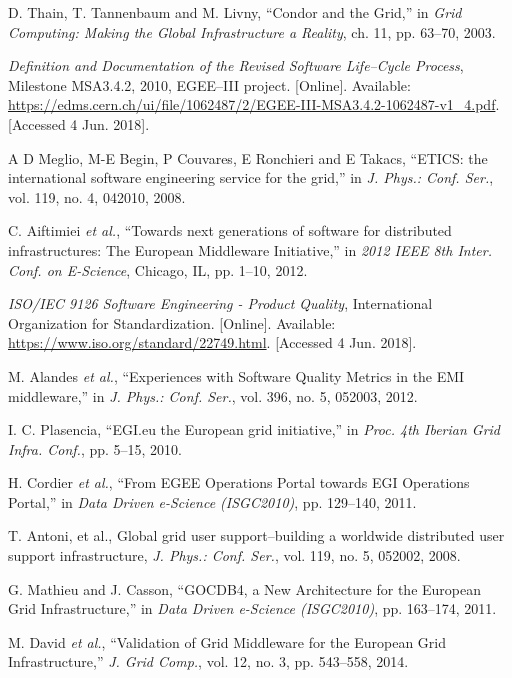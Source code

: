 \documentclass[journal]{IEEEtran}
\begin{document}
\begin{thebibliography}{1}
D. Thain, T. Tannenbaum and M. Livny,
``Condor and the Grid,''
in \emph{Grid Computing: Making the Global Infrastructure a Reality},
ch. 11, pp. 63--70, 2003.


\emph{Definition and Documentation of the Revised Software Life--Cycle Process},
Milestone MSA3.4.2, 2010, EGEE--III project.
[Online]. Available: \url{https://edms.cern.ch/ui/file/1062487/2/EGEE-III-MSA3.4.2-1062487-v1_4.pdf}.
[Accessed 4 Jun. 2018].

A D Meglio, M-E Begin, P Couvares, E Ronchieri and E Takacs,
``ETICS: the international software engineering service for the grid,''
in \emph{J. Phys.: Conf. Ser.},
vol. 119, no. 4, 042010, 2008.



C. Aiftimiei \emph{et al.},
``Towards next generations of software for distributed infrastructures: The European Middleware Initiative,''
in \emph{2012 IEEE 8th Inter. Conf. on E-Science},
Chicago, IL, pp. 1--10, 2012.

\emph{ISO/IEC 9126 Software Engineering - Product Quality},
International Organization for Standardization.
[Online]. Available: \url{https://www.iso.org/standard/22749.html}.
[Accessed 4 Jun. 2018].

M. Alandes \emph{et al.},
``Experiences with Software Quality Metrics in the EMI middleware,''
in \emph{J. Phys.: Conf. Ser.},
vol. 396, no. 5, 052003, 2012.

I. C. Plasencia,
``EGI.eu the European grid initiative,''
in \emph{Proc. 4th Iberian Grid Infra. Conf.},
pp. 5--15, 2010.

H. Cordier \emph{et al.},
``From EGEE Operations Portal towards EGI Operations Portal,''
in \emph{Data Driven e-Science (ISGC2010)},
pp. 129--140, 2011.

T. Antoni, et al.,
Global grid user support--building a worldwide distributed user support infrastructure,
\emph{J. Phys.: Conf. Ser.},
vol. 119, no. 5, 052002, 2008.

G. Mathieu and J. Casson,
``GOCDB4, a New Architecture for the European Grid Infrastructure,''
in \emph{Data Driven e-Science (ISGC2010)},
pp. 163--174, 2011.

M. David \emph{et al.},
``Validation of Grid Middleware for the European Grid Infrastructure,''
\emph{J. Grid Comp.},
vol. 12, no. 3, pp. 543--558, 2014.


\end{thebibliography}
\end{document}
